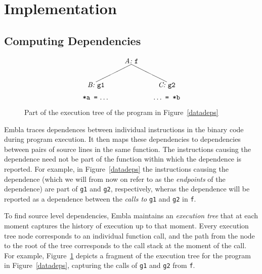 \section{Implementation}

\subsection{Computing Dependencies}   \label{snca}

\begin{figure} \small
\hrulefill
\[
\begin{picture}(160,60)(70,15)
\put(120,65){\makebox(60,10)[c]{\it A:\ \tt f}}
\put(150,65){\line(-2,-1){50}}
\put(150,65){\line( 2,-1){50}}
\put(170,30){\makebox(60,10)[c]{\it C:\ \tt g2}}
\put(70,30){\makebox(60,10)[c]{\it B:\ \tt g1}}
\put(70,15){\makebox(60,10)[cb]{{\tt *a\ =}\ \ldots}}
\put(170,15){\makebox(60,10)[cb]{\ldots\ {\tt =\ *b}}}
\end{picture}
\]
\hrulefill
\caption{Part of the execution tree of the program in Figure~\ref{datadeps}
} 
\label{ffextree}
\end{figure}

Embla traces dependences between individual instructions in the binary
code during program execution. It then maps these dependencies to 
dependencies between pairs of source lines in the same function. The
instructions causing the dependence need not be part of the function 
within which the dependence is reported. For example, in 
Figure~\ref{datadeps} the instructions causing the dependence (which we
will from now on refer to as the {\em endpoints} of the dependence) 
are part of {\tt g1} and {\tt g2}, respectively, wheras the dependence 
will be reported as a dependence between the {\em calls to} {\tt g1} and 
{\tt g2} in {\tt f}.

To find source level dependencies, Embla maintains an {\em execution tree} 
that at each moment captures 
the history of execution up to that moment. Every execution tree node 
corresponds to an
individual function call, and the path from the node to the root of the
tree corresponds to the call stack at the moment of the call. For
example, Figure~\ref{ffextree} depicts a fragment of the execution tree
for the program in Figure~\ref{datadeps}, capturing the calls of {\tt g1} 
and {\tt g2} from {\tt f}.

